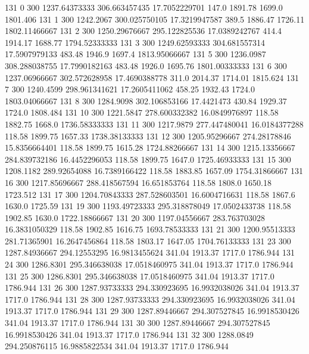 131  0  300  1237.64373333  306.663457435  17.7052229701  147.0  1891.78  1699.0  1801.406 
131  1  300  1242.2067  300.025750105  17.3219947587  389.5  1886.47  1726.11  1802.11466667 
131  2  300  1250.29676667  295.122825536  17.0389242767  414.4  1914.17  1688.77  1794.52333333 
131  3  300  1249.62593333  304.681557314  17.5907979133  483.48  1946.9  1697.4  1813.95066667 
131  5  300  1236.0987  308.288038755  17.7990182163  483.48  1926.0  1695.76  1801.00333333 
131  6  300  1237.06966667  302.572628958  17.4690388778  311.0  2014.37  1714.01  1815.624 
131  7  300  1240.4599  298.961341621  17.2605411062  458.25  1932.43  1724.0  1803.04066667 
131  8  300  1284.9098  302.106853166  17.4421473  430.84  1929.37  1724.0  1808.484 
131  10  300  1221.5847  278.600332382  16.0849976897  118.58  1882.75  1668.0  1736.58333333 
131  11  300  1217.9879  277.447480041  16.0184377288  118.58  1899.75  1657.33  1738.38133333 
131  12  300  1205.95296667  274.28178846  15.8356664401  118.58  1899.75  1615.28  1724.88266667 
131  14  300  1215.13356667  284.839732186  16.4452296053  118.58  1899.75  1647.0  1725.46933333 
131  15  300  1208.1182  289.92654088  16.7389166422  118.58  1883.85  1657.09  1754.31866667 
131  16  300  1217.85696667  288.418567594  16.651853764  118.58  1808.0  1650.18  1723.512 
131  17  300  1204.70843333  287.528603501  16.6004716631  118.58  1867.6  1630.0  1725.59 
131  19  300  1193.49723333  295.318878049  17.0502433738  118.58  1902.85  1630.0  1722.18866667 
131  20  300  1197.04556667  283.763703028  16.3831050329  118.58  1902.85  1616.75  1693.78533333 
131  21  300  1200.95513333  281.71365901  16.2647456864  118.58  1803.17  1647.05  1704.76133333 
131  23  300  1287.84936667  294.12553295  16.9813455624  341.04  1913.37  1717.0  1786.944 
131  24  300  1286.8301  295.346638038  17.0518460975  341.04  1913.37  1717.0  1786.944 
131  25  300  1286.8301  295.346638038  17.0518460975  341.04  1913.37  1717.0  1786.944 
131  26  300  1287.93733333  294.330923695  16.9932038026  341.04  1913.37  1717.0  1786.944 
131  28  300  1287.93733333  294.330923695  16.9932038026  341.04  1913.37  1717.0  1786.944 
131  29  300  1287.89446667  294.307527845  16.9918530426  341.04  1913.37  1717.0  1786.944 
131  30  300  1287.89446667  294.307527845  16.9918530426  341.04  1913.37  1717.0  1786.944 
131  32  300  1288.0849  294.250876115  16.9885822534  341.04  1913.37  1717.0  1786.944 

